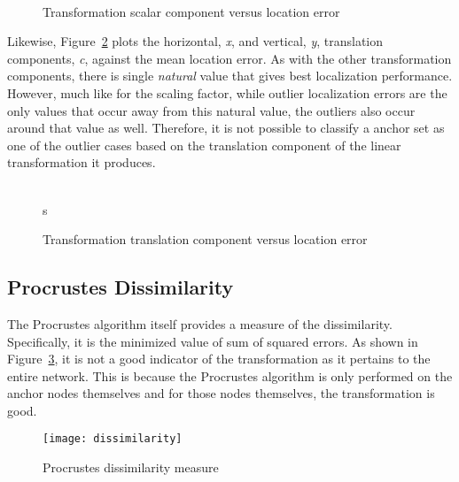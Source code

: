 \begin{figure}
  \centering
\\
	\caption{Transformation scalar component versus location error}	
	\label{fig:scalar}
\end{figure}

Likewise, Figure~\ref{fig:translate} plots the horizontal, \emph{x}, and vertical, \emph{y}, translation components, \emph{c}, against the mean location error. As with the other transformation components, there is single \emph{natural} value that gives best localization performance.  However, much like for the scaling factor, while outlier localization errors are the only values that occur away from this natural value, the outliers also occur around that value as well.  Therefore, it is not possible to classify a anchor set as one of the outlier cases based on the translation component of the linear transformation it produces.

\begin{figure}
  \centering
\\
s	\caption{Transformation translation component versus location error}	
	\label{fig:translate}
\end{figure}

\subsection{Procrustes Dissimilarity}

The Procrustes algorithm itself provides a measure of the dissimilarity.  Specifically, it is the minimized value of sum of squared errors\cite{procrustes-matlab}.  As shown in Figure~\ref{fig:dissimilarity}, it is not a good indicator of the transformation as it pertains to the entire network.  This is because the Procrustes algorithm is only performed on the anchor nodes themselves and for those nodes themselves, the transformation is good.

\begin{figure}
  \centering
	\texttt{[image: dissimilarity]}
	\caption{Procrustes dissimilarity measure}	
	\label{fig:dissimilarity}
\end{figure}

